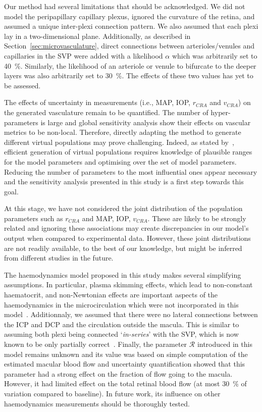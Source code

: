 \documentclass[11pt,]{article}
\begin{document}
Our method had several limitations that should be acknowledged.
We did not model the peripapillary capillary plexus, ignored the curvature of the retina, and assumed a unique inter-plexi connection pattern.
We also assumed that each plexi lay in a two-dimensional plane.
Additionally, as described in Section~\ref{sec:microvasculature}, direct connections between arterioles/venules and capillaries in the SVP were added with a likelihood $\alpha$ which was arbitrarily set to \SI{40}{\percent}.
Similarly, the likelihood of an arteriole or venule to bifurcate to the deeper layers was also arbitrarily set to \SI{30}{\percent}.
The effects of these two values has yet to be assessed.

The effects of uncertainty in measurements (i.e., MAP, IOP, $r_{CRA}$ and $v_{CRA}$) on the generated vasculature remain to be quantified.
The number of hyper-parameters is large and global sensitivity analysis show their effects on vascular metrics to be non-local.
Therefore, directly adapting the method to generate different virtual populations may prove challenging.
Indeed, as stated by~\cite{Allen_2016}, efficient generation of virtual populations requires knowledge of plausible ranges for the model parameters and optimising over the set of model parameters.
Reducing the number of parameters to the most influential ones appear necessary and the sensitivity analysis presented in this study is a first step towards this goal.

At this stage, we have not considered the joint distribution of the population parameters such as $r_{CRA}$ and MAP, IOP, $v_{CRA}$.
These are likely to be strongly related and ignoring these associations may create discrepancies in our model's output when compared to experimental data.
However, these joint distributions are not readily available, to the best of our knowledge, but might be inferred from different studies in the future.

The haemodynamics model proposed in this study makes several simplifying assumptions.
In particular, plasma skimming effects, which lead to non-constant haematocrit, and non-Newtonian effects are important aspects of the haemodynamics in the microcirculation which were not incorporated in this model~\cite{Faahraeus1931,Secomb2013}.
Additionnaly, we assumed that there were no lateral connections between the ICP and DCP and the circulation outside the macula.
This is similar to assuming both plexi being connected `\textit{in-series}' with the SVP, which is now known to be only partially correct~\cite{An2020}.
Finally, the parameter $\mathcal R$ introduced in this model remains unknown and its value was based on simple computation of the estimated macular blood flow and uncertainty quantification showed that this parameter had a strong effect on the fraction of flow going to the macula.
However, it had limited effect on the total retinal blood flow (at most \SI{30}{\percent} of variation compared to baseline).
In future work, its influence on other haemodynamics measurements should be thoroughly tested.
\end{document}
